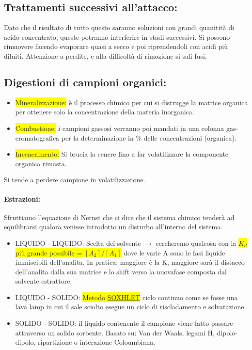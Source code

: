 \documentclass{article}
\begin{document}
\subsection{Trattamenti successivi all'attacco:} Dato che il risultato di tutto questo saranno soluzioni con grandi quanitità di acido concentrato, queste potranno interferire in stadi successivi. Si possono rimuovere facendo evaporare quasi a secco e poi riprendendoli con acidi più diluiti. Attenzione a perdite, e alla difficoltà di rimozione si sali fusi.
\subsection{Digestioni di campioni organici:} 
\begin{itemize}
	\item \colorbox{yellow}{Mineralizzazione:} è il processo chimico per cui si distrugge la matrice organica per ottenere solo la concentrazione della materia inorganica.
	\item \colorbox{yellow}{Combustione:} i campioni gassosi verranno poi mandati in una colonna gas-cromatografica per la determinazione in \% delle concentrazioni (organica).
	\item \colorbox{yellow}{Incenerimento:} Si brucia la cenere fino a far volatilizzare la componente organica rimasta.
\end{itemize}	
Si tende a perdere campione in volatilizzazione.


\paragraph{Estrazioni:} Sfruttiamo l'equazione di Nernst che ci dice che il sistema chimico tenderà ad equilibrarsi qualora venisse introdotto un disturbo all'interno del sistema.
\begin{itemize}
	\item LIQUIDO - LIQUIDO: Scelta del solvente $\rightarrow$ cercheremo qualcosa con la \colorbox{yellow}{$K_d$ più grande possibile = $[A_2] / [A_1]$} dove le varie A sono le fasi liquide immiscibili dell'analita. In pratica: maggiore è la K, maggiore sarà il distacco dell'analita dalla sua matrice e lo shift verso la nuovafase composta dal solvente estrattore.
	\item LIQUIDO - SOLIDO: \colorbox{yellow}{Metodo \underline{SOXHLET}} ciclo continuo come se fosse una lava lamp in cui il sale sciolto esegue un ciclo di riscladamento e solvatazione.
	\item SOLIDO - SOLIDO: il liquido contenente il campione viene fatto passare attraverso un solido sorbente. Basato su: Van der Waals, legami H, dipolo-dipolo, ripartizione o interazione Coloumbiana. 
\end{itemize}
\end{document}
